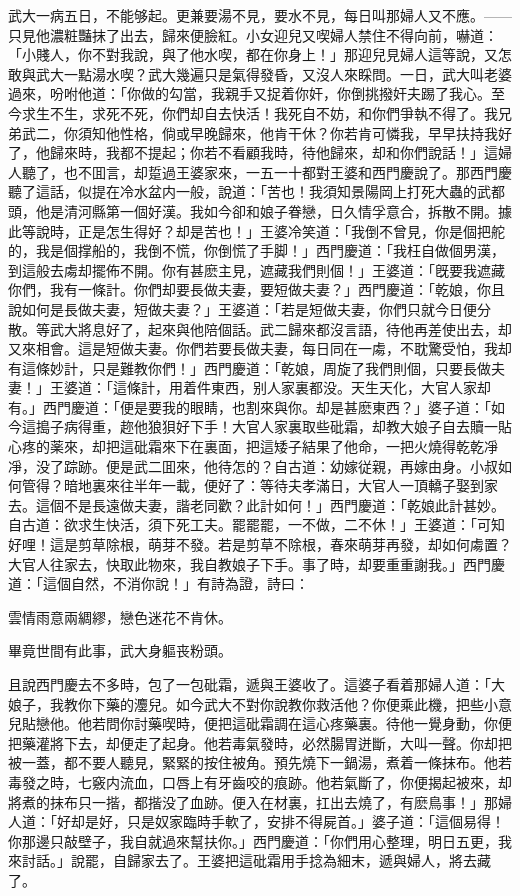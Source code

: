 武大一病五日，不能够起。更兼要湯不見，要水不見，每日叫那婦人又不應。——只見他濃粧豔抹了出去，歸來便臉紅。小女迎兒又喫婦人禁住不得向前，嚇道：「小賤人，你不對我說，與了他水喫，都在你身上！」那迎兒見婦人這等說，又怎敢與武大一點湯水喫？武大幾遍只是氣得發昏，又沒人來睬問。一日，武大叫老婆過來，吩咐他道：「你做的勾當，我親手又捉着你奸，你倒挑撥奸夫踢了我心。至今求生不生，求死不死，你們却自去快活！我死自不妨，和你們爭執不得了。我兄弟武二，你須知他性格，倘或早晚歸來，他肯干休？你若肯可憐我，早早扶持我好了，他歸來時，我都不提起；你若不看顧我時，待他歸來，却和你們說話！」這婦人聽了，也不囬言，却踅過王婆家來，一五一十都對王婆和西門慶說了。那西門慶聽了這話，似提在冷水盆内一般，說道：「苦也！我須知景陽岡上打死大蟲的武都頭，他是清河縣第一個好漢。我如今卻和娘子眷戀，日久情孚意合，拆散不開。據此等說時，正是怎生得好？却是苦也！」王婆冷笑道：「我倒不曾見，你是個把舵的，我是個撑船的，我倒不慌，你倒慌了手脚！」西門慶道：「我枉自做個男漢，到這般去䖏却擺佈不開。你有甚麽主見，遮藏我們則個！」王婆道：「旣要我遮藏你們，我有一條計。你們却要長做夫妻，要短做夫妻？」西門慶道：「乾娘，你且說如何是長做夫妻，短做夫妻？」王婆道：「若是短做夫妻，你們只就今日便分散。等武大將息好了，起來與他陪個話。武二歸來都沒言語，待他再差使出去，却又來相會。這是短做夫妻。你們若要長做夫妻，每日同在一䖏，不耽驚受怕，我却有這條妙計，只是難教你們！」西門慶道：「乾娘，周旋了我們則個，只要長做夫妻！」王婆道：「這條計，用着件東西，别人家裏都没。天生天化，大官人家却有。」西門慶道：「便是要我的眼睛，也割來與你。却是甚麽東西？」婆子道：「如今這搗子病得重，趂他狼狽好下手！大官人家裏取些砒霜，却教大娘子自去贖一貼心疼的薬來，却把這砒霜來下在裏面，把這矮子結果了他命，一把火燒得乾乾凈凈，没了踪跡。便是武二囬來，他待怎的？自古道：幼嫁従親，再嫁由身。小叔如何管得？暗地裏來往半年一載，便好了：等待夫孝滿日，大官人一頂轎子娶到家去。這個不是長遠做夫妻，諧老同歡？此計如何！」西門慶道：「乾娘此計甚妙。自古道：欲求生快活，須下死工夫。罷罷罷，一不做，二不休！」王婆道：「可知好哩！這是剪草除根，萌芽不發。若是剪草不除根，春來萌芽再發，却如何䖏置？大官人往家去，快取此物來，我自教娘子下手。事了時，却要重重謝我。」西門慶道：「這個自然，不消你說！」有詩為證，詩曰：

雲情雨意兩綢繆，戀色迷花不肯休。

畢竟世間有此事，武大身軀丧粉頭。

且說西門慶去不多時，包了一包砒霜，遞與王婆收了。這婆子看着那婦人道：「大娘子，我教你下藥的灋兒。如今武大不對你說教你救活他？你便乘此機，把些小意兒貼戀他。他若問你討藥喫時，便把這砒霜調在這心疼藥裏。待他一覺身動，你便把藥灌將下去，却便走了起身。他若毒氣發時，必然腸胃迸斷，大叫一聲。你却把被一蓋，都不要人聽見，緊緊的按住被角。預先燒下一鍋湯，煮着一條抹布。他若毒發之時，七竅内流血，口唇上有牙齒咬的痕跡。他若氣斷了，你便揭起被來，却將煮的抹布只一揩，都揩没了血跡。便入在材裏，扛出去燒了，有麽鳥事！」那婦人道：「好却是好，只是奴家臨時手軟了，安排不得屍首。」婆子道：「這個易得！你那邊只敲壁子，我自就過來幫扶你。」西門慶道：「你們用心整理，明日五更，我來討話。」說罷，自歸家去了。王婆把這砒霜用手捻為細末，遞與婦人，將去藏了。

